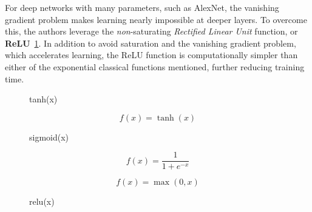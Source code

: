 \documentclass[10pt]{article}
\begin{document}
For deep networks with many parameters, such as AlexNet, the vanishing gradient problem makes learning nearly impossible at deeper layers. To overcome this, the authors leverage the \textit{non}-saturating \textit{Rectified Linear Unit} function, or \textbf{ReLU}~\ref{fig:relu}. In addition to avoid saturation and the vanishing gradient problem, which accelerates learning, the ReLU function is computationally simpler than either of the exponential classical functions mentioned, further reducing training time.
\begin{figure}[h]
    \begin{minipage}{0.33\textwidth}
        \centering
        \caption{tanh(x)}
        \label{fig:tanh}
        \begin{equation*}
            f(x) = \tanh(x)
        \end{equation*}
    \end{minipage}%
    \begin{minipage}{0.33\textwidth}
        \centering
        \caption{sigmoid(x)}
        \label{fig:sigmoid}
        \begin{equation*}
            f(x) = \frac{1}{1+e^{-x}}
        \end{equation*}
    \end{minipage}%
    \begin{minipage}{0.33\textwidth}
        \centering
        \caption{relu(x)}
        \label{fig:relu}
        \begin{equation*}
            f(x) = \max(0,x)
        \end{equation*}
    \end{minipage}
\end{figure}
\end{document}
